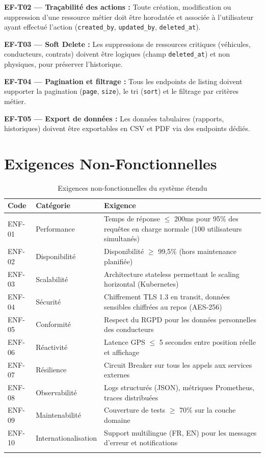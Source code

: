 \documentclass[12pt,a4paper]{report}
\begin{document}
\begin{reqbox}
\textbf{EF-T02 — Traçabilité des actions :} Toute création, modification ou suppression d'une ressource métier doit être horodatée et associée à l'utilisateur ayant effectué l'action (\texttt{created\_by}, \texttt{updated\_by}, \texttt{deleted\_at}).
\end{reqbox}

\begin{reqbox}
\textbf{EF-T03 — Soft Delete :} Les suppressions de ressources critiques (véhicules, conducteurs, contrats) doivent être logiques (champ \texttt{deleted\_at}) et non physiques, pour préserver l'historique.
\end{reqbox}

\begin{reqbox}
\textbf{EF-T04 — Pagination et filtrage :} Tous les endpoints de listing doivent supporter la pagination (\texttt{page}, \texttt{size}), le tri (\texttt{sort}) et le filtrage par critères métier.
\end{reqbox}

\begin{reqbox}
\textbf{EF-T05 — Export de données :} Les données tabulaires (rapports, historiques) doivent être exportables en CSV et PDF via des endpoints dédiés.
\end{reqbox}

\section{Exigences Non-Fonctionnelles}

\begin{longtable}{p{2cm}p{3.5cm}p{7.5cm}}
\toprule
\textbf{Code} & \textbf{Catégorie} & \textbf{Exigence} \\
\midrule
\endhead
ENF-01 & Performance & Temps de réponse $\leq$ 200ms pour 95\% des requêtes en charge normale (100 utilisateurs simultanés) \\
ENF-02 & Disponibilité & Disponibilité $\geq$ 99,5\% (hors maintenance planifiée) \\
ENF-03 & Scalabilité & Architecture stateless permettant le scaling horizontal (Kubernetes) \\
ENF-04 & Sécurité & Chiffrement TLS 1.3 en transit, données sensibles chiffrées au repos (AES-256) \\
ENF-05 & Conformité & Respect du RGPD pour les données personnelles des conducteurs \\
ENF-06 & Réactivité & Latence GPS $\leq$ 5 secondes entre position réelle et affichage \\
ENF-07 & Résilience & Circuit Breaker sur tous les appels aux services externes \\
ENF-08 & Observabilité & Logs structurés (JSON), métriques Prometheus, traces distribuées \\
ENF-09 & Maintenabilité & Couverture de tests $\geq$ 70\% sur la couche domaine \\
ENF-10 & Internationalisation & Support multilingue (FR, EN) pour les messages d'erreur et notifications \\
\bottomrule
\caption{Exigences non-fonctionnelles du système étendu}
\end{longtable}
\end{document}
